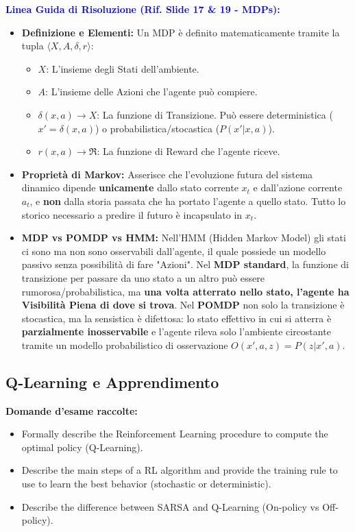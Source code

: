 \documentclass[11pt,a4paper]{article}
\begin{document}
\textbf{\textcolor{blue}{Linea Guida di Risoluzione (Rif. Slide 17 \& 19 - MDPs):}}
\begin{itemize}
    \item \textbf{Definizione e Elementi:} Un MDP è definito matematicamente tramite la tupla $\langle X, A, \delta, r \rangle$:
    \begin{itemize}
        \item $X$: L'insieme degli Stati dell'ambiente.
        \item $A$: L'insieme delle Azioni che l'agente può compiere.
        \item $\delta(x, a) \to X$: La funzione di Transizione. Può essere deterministica ($x' = \delta(x,a)$) o probabilistica/stocastica ($P(x'|x,a)$).
        \item $r(x, a) \to \Re$: La funzione di Reward che l'agente riceve.
    \end{itemize}
    \item \textbf{Proprietà di Markov:} Asserisce che l'evoluzione futura del sistema dinamico dipende \textbf{unicamente} dallo stato corrente $x_t$ e dall'azione corrente $a_t$, e \textbf{non} dalla storia passata che ha portato l'agente a quello stato. Tutto lo storico necessario a predire il futuro è incapsulato in $x_t$.
    \item \textbf{MDP vs POMDP vs HMM:} Nell'HMM (Hidden Markov Model) gli stati ci sono ma non sono osservabili dall'agente, il quale possiede un modello passivo senza possibilità di fare "Azioni". Nel \textbf{MDP standard}, la funzione di transizione per passare da uno stato a un altro può essere rumorosa/probabilistica, ma \textbf{una volta atterrato nello stato, l'agente ha Visibilità Piena di dove si trova}. Nel \textbf{POMDP} non solo la transizione è stocastica, ma la sensistica è difettosa: lo stato effettivo in cui si atterra è \textbf{parzialmente inosservabile} e l'agente rileva solo l'ambiente circostante tramite un modello probabilistico di osservazione $O(x', a, z) = P(z|x', a)$.
\end{itemize}

\subsection{Q-Learning e Apprendimento}
\textbf{Domande d'esame raccolte:}
\begin{itemize}
    \item Formally describe the Reinforcement Learning procedure to compute the optimal policy (Q-Learning).
    \item Describe the main steps of a RL algorithm and provide the training rule to use to learn the best behavior (stochastic or deterministic).
    \item Describe the difference between SARSA and Q-Learning (On-policy vs Off-policy).
\end{itemize}
\end{document}
